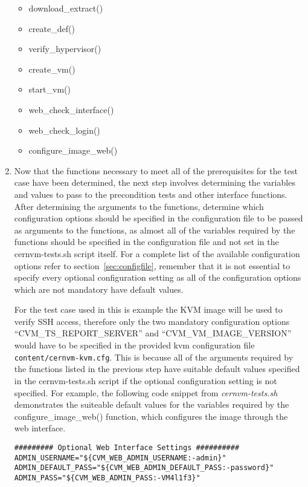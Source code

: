 \begin{enumerate}
			\begin{itemize}
				\item	download\_extract()
				\item	create\_def()
				\item	verify\_hypervisor()
				\item	create\_vm()
				\item	start\_vm()
				\item	web\_check\_interface()
				\item	web\_check\_login()
				\item	configure\_image\_web()
			\end{itemize}
			
\item	Now that the functions necessary to meet all of the prerequisites for the \cernvm test case have been determined, the next
			step involves determining the variables and values to pass to the precondition tests and other interface functions. After determining 
			the arguments to the functions, determine which configuration options should be specified in the configuration file to be passed as
			arguments to the functions, as almost all of the variables required by the functions should be specified in the configuration file and
			not set in the cernvm-tests.sh script itself. For a complete list of the available configuration options refer to section~\ref{sec:configfile},
			remember that it is not essential to specify every optional configuration setting as all of the configuration options which are not mandatory 
			have default values.
			
			For the test case used in this is example the KVM \cernvm image will be used to verify SSH access, therefore only the two
			mandatory configuration options ``CVM\_TS\_REPORT\_SERVER'' and ``CVM\_VM\_IMAGE\_VERSION'' would have to 
			be specified in the provided kvm configuration file \verb|content/cernvm-kvm.cfg|. This is because all of the arguments
			required by the functions listed in the previous step have suitable default values specified in the cernvm-tests.sh script
			if the optional configuration setting is not specified. For example, the following code snippet from \emph{cernvm-tests.sh}
			demonstrates the suiteable default values for the variables required by the configure\_image\_web() function, which
			configures the \cernvm image through the web interface.
			
\lstset{language=bash,caption=Suiteable Default Values for the Web Interface}
\begin{lstlisting}
######### Optional Web Interface Settings ##########
ADMIN_USERNAME="${CVM_WEB_ADMIN_USERNAME:-admin}"
ADMIN_DEFAULT_PASS="${CVM_WEB_ADMIN_DEFAULT_PASS:-password}"
ADMIN_PASS="${CVM_WEB_ADMIN_PASS:-VM4l1f3}"


\end{lstlisting}
\end{enumerate}
